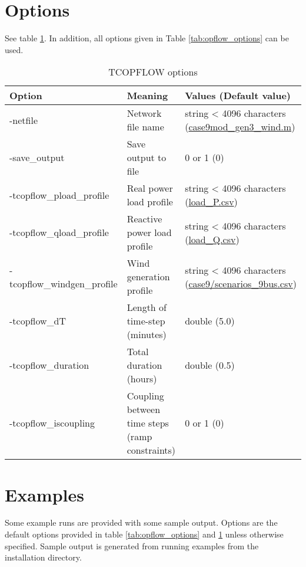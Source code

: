 \section{Options}
See table \ref{tab:tcopflow_options}. In addition, all \opflow options given in Table \ref{tab:opflow_options} can be used.
\begin{table}[!htbp]
  \caption{TCOPFLOW options}
  \small
  \begin{tabular}{|p{}|p{}|p{}|}
    \hline
    \textbf{Option} & \textbf{Meaning} & \textbf{Values (Default value)} \\ \hline
    -netfile & Network file name & string < 4096 characters (\href{https://gitlab.pnnl.gov/exasgd/frameworks/exago/-/blob/master/datafiles/case9/case9mod_gen3_wind.m}{case9mod\_gen3\_wind.m}) \\ \hline
    -save\_output & Save output to file & 0 or 1 (0) \\ \hline
    -tcopflow\_pload\_profile & Real power load profile & string < 4096 characters (\href{https://gitlab.pnnl.gov/exasgd/frameworks/exago/-/blob/master/datafiles/case9/load_P.csv}{load\_P.csv}) \\ \hline
    -tcopflow\_qload\_profile & Reactive power load profile & string < 4096 characters (\href{https://gitlab.pnnl.gov/exasgd/frameworks/exago/-/blob/master/datafiles/case9/load_Q.csv}{load\_Q.csv}) \\ \hline
    -tcopflow\_windgen\_profile & Wind generation profile & string < 4096 characters (\href{https://gitlab.pnnl.gov/exasgd/frameworks/exago/-/blob/master/datafiles/case9/scenarios_9bus.csv}{case9/scenarios\_9bus.csv}) \\ \hline
    -tcopflow\_dT & Length of time-step (minutes) & double (5.0) \\ \hline
    -tcopflow\_duration & Total duration (hours) & double (0.5) \\ \hline 
    -tcopflow\_iscoupling & Coupling between time steps (ramp constraints) & 0 or 1 (0) \\ \hline
  \end{tabular}
  \label{tab:tcopflow_options}
\end{table}
\section{Examples}
Some \tcopflow example runs are provided with some sample output. Options are the default options provided in table \ref{tab:opflow_options} and \ref{tab:tcopflow_options} unless otherwise specified. Sample output is generated from running examples from the installation directory.

